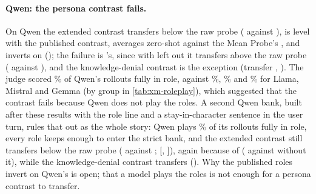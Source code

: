 \paragraph{Qwen: the persona contrast fails.} On Qwen the extended contrast transfers below the raw probe
( against ), is level with the published contrast, averages
 zero-shot against the Mean Probe's , and inverts on \hpkr{}
(); the failure is \hpkr's, since with \hpkr{} left out it transfers above the raw
probe ( against ), and the knowledge-denial contrast is the
exception (transfer , \hpkr{} ). The judge scored
\% of Qwen's rollouts fully in role, against \%,
\% and \% for Llama, Mistral and Gemma (by group in
\cref{tab:xm-roleplay}), which suggested that the contrast fails because Qwen does not play the roles. A second Qwen bank, built after these results with
the role line and a stay-in-character sentence in the user turn, rules that out as the whole story: Qwen
plays \% of its rollouts fully in role, every role keeps enough to enter the strict bank,
and the extended contrast still transfers below the raw probe ( against
;  [, ]),
again because of \hpkr{} ( against  without it), while the
knowledge-denial contrast transfers (). Why the published roles invert on Qwen's \hpkr{}
is open; that a model plays the roles is not enough for a persona contrast to transfer.

